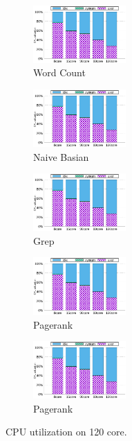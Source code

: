 \begin{figure}[tb]
    \centering
    \begin{subfigure}[b]{0.20\textwidth}
        \includegraphics[width=1.4in]{graph/wc_cpuutils.eps}
        \caption{Word Count}
    \end{subfigure}%
    \begin{subfigure}[b]{0.20\textwidth}
        \includegraphics[width=1.4in]{graph/wc_cpuutils.eps}
        \caption{Naive Basian}
    \end{subfigure}%
    \begin{subfigure}[b]{0.20\textwidth}
        \includegraphics[width=1.4in]{graph/wc_cpuutils.eps}
        \caption{Grep}
    \end{subfigure}%
        \begin{subfigure}[b]{0.20\textwidth}
        \includegraphics[width=1.4in]{graph/wc_cpuutils.eps}
        \caption{Pagerank}
    \end{subfigure}%
        \begin{subfigure}[b]{0.20\textwidth}
        \includegraphics[width=1.4in]{graph/wc_cpuutils.eps}
        \caption{Pagerank}
    \end{subfigure}
        \centering
    \caption{CPU utilization on 120 core.}
    \label{fig:utilization2}
\end{figure}



